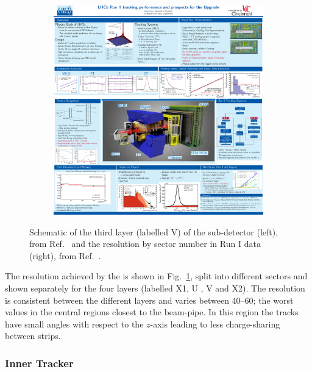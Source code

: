 \begin{figure}[!h]
\begin{subfigure}[m]{0.49\textwidth}
        \includegraphics[width=1.0\textwidth]{figs/Detector/tt_resolution.pdf}
    \end{subfigure}
    \caption{Schematic of the third layer (labelled V) of the \ttracker sub-detector (left), from Ref.~\cite{Alves:2008zz} and the \ttracker resolution by sector number in Run I data (right), from Ref.~\cite{LHCb-DP-2014-002}.}
    \label{fig:Dec_tt_scematic}   
\end{figure}


The resolution achieved by the \ttracker is shown in Fig.~\ref{fig:Dec_tt_scematic}, split into different sectors and shown separately for the four layers (labelled X1, U , V and X2). The resolution is consistent between the different layers and varies between 40--60\mum; the worst values in the central regions closest to the beam-pipe. In this region the tracks have small angles with respect to the $z$-axis leading to less charge-sharing between strips.


\subsubsection{Inner Tracker}

